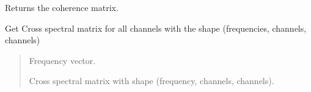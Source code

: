 \documentclass[letterpaper,10pt,english]{sphinxmanual}
\begin{document}
\begin{fulllineitems}
\begin{fulllineitems}
\end{fulllineitems}


\begin{fulllineitems}
\label{\detokenize{classes:dsptools.classes.signal_class.Signal.get_coherence}}
\pysigstartsignatures
{}
\pysigstopsignatures
\sphinxAtStartPar
Returns the coherence matrix.

\end{fulllineitems}


\begin{fulllineitems}
\label{\detokenize{classes:dsptools.classes.signal_class.Signal.get_csm}}
\pysigstartsignatures
{}
\pysigstopsignatures
\sphinxAtStartPar
Get Cross spectral matrix for all channels with the shape
(frequencies, channels, channels)
\begin{quote}\begin{description}
\begin{description}
\sphinxlineitem{\sphinxstylestrong{f\_csm}}{[}\sphinxtitleref{np.ndarray}{]}
\sphinxAtStartPar
Frequency vector.

\sphinxlineitem{\sphinxstylestrong{csm}}{[}\sphinxtitleref{np.ndarray}{]}
\sphinxAtStartPar
Cross spectral matrix with shape (frequency, channels, channels).

\end{description}

\end{description}\end{quote}

\end{fulllineitems}



\end{fulllineitems}
\end{document}
